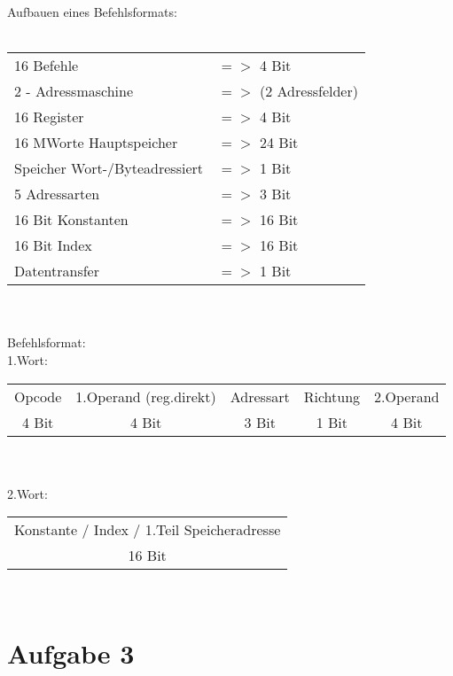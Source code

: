 \documentclass[12pt,a4paper]{scrartcl}
\begin{document}
	Aufbauen eines Befehlsformats: \\
	\\
	\begin{tabular}{l l}
		16 Befehle &$=>$ 4 Bit \\
		2 - Adressmaschine &$=>$ (2 Adressfelder)\\
		16 Register &$=>$ 4 Bit \\
		16 MWorte Hauptspeicher &$=>$ 24 Bit \\
		Speicher Wort-/Byteadressiert &$=>$ 1 Bit\\
		5 Adressarten &$=>$ 3 Bit \\
		16 Bit Konstanten &$=>$ 16 Bit \\
		16 Bit Index &$=>$ 16 Bit \\
		Datentransfer &$=>$ 1 Bit \\
	\end{tabular} \\
	\\
	Befehlsformat:  \\
	1.Wort:
	\begin{tabular}{| c | c | c | c | c |}
		Opcode & 1.Operand (reg.direkt) & Adressart & Richtung & 2.Operand \\
		4 Bit & 4 Bit & 3 Bit & 1 Bit & 4 Bit
	\end{tabular} \\
	\\
	2.Wort:
	\begin{tabular}{| c |}
		Konstante / Index / 1.Teil Speicheradresse \\
		16 Bit 
	\end{tabular} \\
	\newpage
	
	\section*{Aufgabe 3}
	
	\begin{comment}
	\begin{center}
	\begin{tabular}{|c |c | c|} 
	\hline
	Adresse & Mikrobefehl & Kommentar\\
	\hline\hline
	0 & RD & ließt Befehl ein\\ 
	\hline
	1 & WRDY& wartet, bis Speicherzugriff beendet wurde \\
	\hline
	2 & DECODE & dekodiert IR\\
	\hline
	3 & IR\_op\_out& ließt IR\\
	\hline
	4 & SR = Rop2 & wählt Register 2\\
	\hline
	5 & R\_out & schreibt in Register 2\\
	\hline
	6 & WRDY& wartet, bis Speicherzugriff beendet wurde \\
	\hline
	\end{tabular}
	\end{center}
	\end{comment}
	
\end{document}
